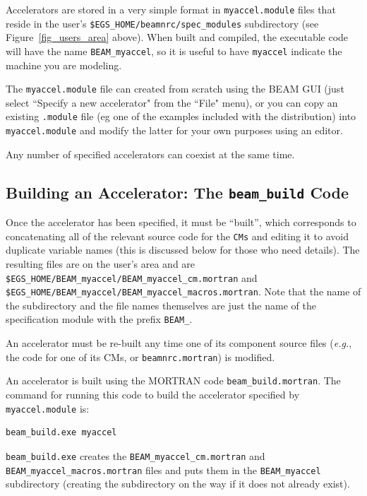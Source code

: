 \documentclass[12pt,twoside]{article}
\begin{document}
Accelerators are stored in a very simple format in
{\tt myaccel.module} files that reside in the
user's {\tt \$EGS\_HOME/beamnrc/spec\_modules} subdirectory (see
Figure~\ref{fig_users_area} above).  When built and compiled, the
executable code will have the name {\tt BEAM\_myaccel}, so
it is useful to have {\tt myaccel} indicate the machine you are
modeling.

The {\tt myaccel.module} file can created from scratch using the
BEAM GUI (just select ``Specify a new accelerator" from the ``File"
menu), or you can copy an existing {\tt .module} file (eg one of the
examples included with the distribution) into {\tt myaccel.module}
and modify the latter for your own purposes using an editor.

Any number of specified accelerators can coexist at the same
time.

\subsection{Building an Accelerator: The {\tt beam\_build} Code}
\label{beambuildsect}

Once the accelerator has been specified, it must be ``built'', which
corresponds to concatenating all of the relevant source code for the
\verb+CMs+
and editing it to avoid duplicate variable names
(this is discussed below for
those who need details).  The resulting files are on the user's area and
are
\verb+$EGS_HOME/BEAM_myaccel/BEAM_myaccel_cm.mortran+ and \\
\verb+$EGS_HOME/BEAM_myaccel/BEAM_myaccel_macros.mortran+.
Note that the name of the subdirectory and the file names themselves
 
are just the name of the specification module with the prefix \verb+BEAM_+.

An accelerator must be re-built any time one of its component source files
({\em e.g.}, the code for one of its CMs, or {\tt beamnrc.mortran}) is
modified.

An accelerator is built using the MORTRAN code {\tt beam\_build.mortran}.
The command for running this code to build the accelerator specified
by {\tt myaccel.module} is:
\begin{verbatim}
beam_build.exe myaccel
\end{verbatim}
{\tt beam\_build.exe} creates the
{\tt BEAM\_myaccel\_cm.mortran} and {\tt BEAM\_myaccel\_macros.mortran} files
and puts them in the {\tt BEAM\_myaccel} subdirectory (creating the subdirectory
on the way if it does not already exist).
\end{document}

